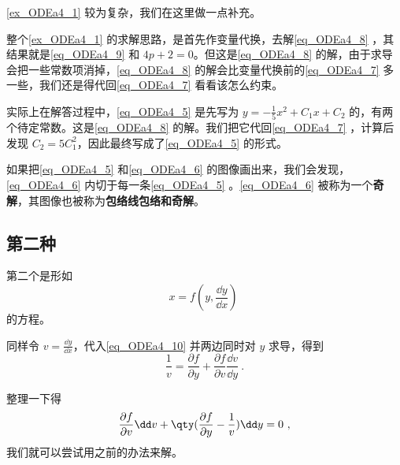 \autoref{ex_ODEa4_1} 较为复杂，我们在这里做一点补充。

整个\autoref{ex_ODEa4_1} 的求解思路，是首先作变量代换，去解\autoref{eq_ODEa4_8} ，其结果就是\autoref{eq_ODEa4_9} 和 $4p+2=0$。但这是\autoref{eq_ODEa4_8} 的解，由于求导会把一些常数项消掉，\autoref{eq_ODEa4_8} 的解会比变量代换前的\autoref{eq_ODEa4_7} 多一些，我们还是得代回\autoref{eq_ODEa4_7} 看看该怎么约束。

实际上在解答过程中，\autoref{eq_ODEa4_5} 是先写为 $y=-\frac{1}{5}x^2+C_1x+C_2$ 的，有两个待定常数。这是\autoref{eq_ODEa4_8} 的解。我们把它代回\autoref{eq_ODEa4_7} ，计算后发现 $C_2=5C_1^2$，因此最终写成了\autoref{eq_ODEa4_5} 的形式。

如果把\autoref{eq_ODEa4_5} 和\autoref{eq_ODEa4_6} 的图像画出来，我们会发现，\autoref{eq_ODEa4_6} 内切于每一条\autoref{eq_ODEa4_5} 
。\autoref{eq_ODEa4_6} 被称为一个\textbf{奇解}，其图像也被称为\textbf{包络线包络和奇解}。








\subsection{第二种}

第二个是形如
\begin{equation}\label{eq_ODEa4_10}
x=f(y, \frac{\dd y}{\dd x})~
\end{equation}
的方程。

同样令 $v=\frac{\dd y}{\dd x}$，代入\autoref{eq_ODEa4_10} 并两边同时对 $y$ 求导，得到
\begin{equation}
\frac{1}{v}=\frac{\partial f}{\partial y}+\frac{\partial f}{\partial v}\frac{\dd v}{\dd y}~.
\end{equation}

整理一下得
\begin{equation}\label{eq_ODEa4_13}
\frac{\partial f}{\partial v}\dd v +\qty(\frac{\partial f}{\partial y}-\frac{1}{v})\dd y=0~,
\end{equation}
我们就可以尝试用之前的办法来解。

